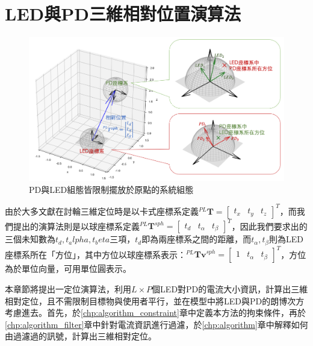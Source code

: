 \chapter{LED與PD三維相對位置演算法}
\label{chp:3}



\begin{figure}[h]
    \centering
    \includegraphics[width=14cm]{ch3pic/algorithm_place.png}
    \caption{PD與LED組態皆限制擺放於原點的系統組態}
    \label{pic:algorithm_coor}
\end{figure}

由於大多文獻在討輪三維定位時是以卡式座標系定義$^{PL}\boldsymbol{T}=\left[\begin{array}{ccc}t_x&t_y&t_z\end{array}\right]^T$，而我們提出的演算法則是以球座標系定義$^{PL}\boldsymbol{T}^{sph}=\left[\begin{array}{ccc}t_d&t_{\alpha}&t_{\beta}\end{array}\right]^T$，因此我們要求出的三個未知數為$t_d,t_alpha,t_beta$三項，$t_d$即為兩座標系之間的距離，而$t_{\alpha},t_{\beta}$則為LED座標系所在「方位」，其中方位以球座標系表示：$^{PL}\boldsymbol{Tv}^{sph} = \left[\begin{array}{ccc}1&t_{\alpha}&t_{\beta}\end{array}\right]^T$，方位為於單位向量，可用單位圓表示。


本章節將提出一定位演算法，利用$L\times P$個LED對PD的電流大小資訊，計算出三維相對定位，且不需限制目標物與使用者平行，並在模型中將LED與PD的朗博次方考慮進去。首先，於\ref{chp:algorithm_constraint}章中定義本方法的拘束條件，再於\ref{chp:algorithm_filter}章中針對電流資訊進行過濾，於\ref{chp:algorithm}章中解釋如何由過濾過的訊號，計算出三維相對定位。




